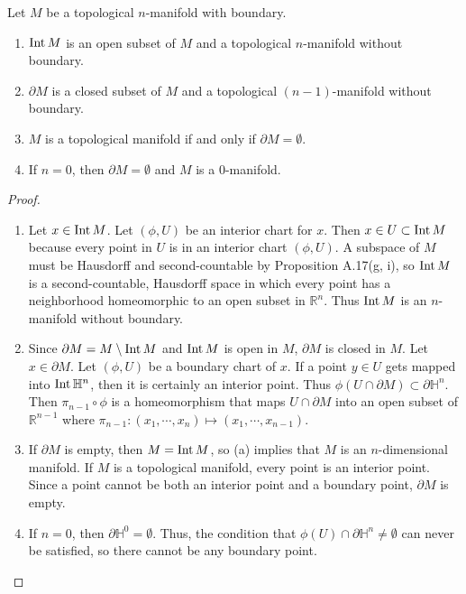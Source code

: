 \begin{customexer}{1.39}\label{exercise_1_39}
  Let $M$ be a topological $n$-manifold with boundary.
  \begin{enumerate}[label=(\alph*)]
    \item
      $\operatorname{Int} M$ is an open subset of $M$ and a topological $n$-manifold without boundary.
    \item
      $\partial M$ is a closed subset of $M$ and a topological $(n - 1)$-manifold without boundary.
    \item
      $M$ is a topological manifold if and only if $\partial M = \emptyset$.
    \item
      If $n = 0$, then $\partial M = \emptyset$ and $M$ is a 0-manifold.
  \end{enumerate}
\end{customexer}

\begin{proof}
  $ $
  \begin{enumerate}[label=(\alph*)]
    \item
      Let $x \in \operatorname{Int} M$.
      Let $(\phi, U)$ be an interior chart for $x$.
      Then $x \in U \subset \operatorname{Int} M$ because every point in $U$ is in an interior chart $(\phi, U)$.
      A subspace of $M$ must be Hausdorff and second-countable by Proposition A.17(g, i), so $\operatorname{Int} M$ is a second-countable, Hausdorff space in which every point has a neighborhood homeomorphic to an open subset in $\mathbb{R}^n$.
      Thus $\operatorname{Int} M$ is an $n$-manifold without boundary.
    \item
      Since $\partial M = M \setminus \operatorname{Int} M$ and $\operatorname{Int} M$ is open in $M$, $\partial M$ is closed in $M$.
      Let $x \in \partial M$.
      Let $(\phi, U)$ be a boundary chart of $x$.
      If a point $y \in U$ gets mapped into $\operatorname{Int} \mathbb{H}^n$, then it is certainly an interior point.
      Thus $\phi(U \cap \partial M) \subset \partial \mathbb{H}^n$.
      Then $\pi_{n - 1} \circ \phi$ is a homeomorphism that maps $U \cap \partial M$ into an open subset of $\mathbb{R}^{n - 1}$ where $\pi_{n - 1}: (x_1, \cdots, x_n) \mapsto (x_1, \cdots, x_{n - 1 })$.
    \item
      If $\partial M$ is empty, then $M = \operatorname{Int} M$, so (a) implies that $M$ is an $n$-dimensional manifold.
      If $M$ is a topological manifold, every point is an interior point.
      Since a point cannot be both an interior point and a boundary point, $\partial M$ is empty.
    \item
      If $n = 0$, then $\partial \mathbb{H}^0 = \emptyset$.
      Thus, the condition that $\phi(U) \cap \partial \mathbb{H}^n \ne \emptyset$ can never be satisfied, so there cannot be any boundary point.
  \end{enumerate}
\end{proof}

